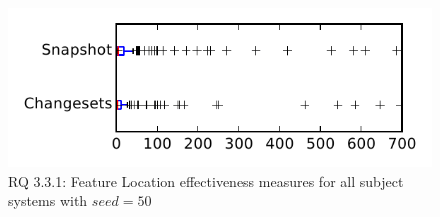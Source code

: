 
\begin{figure}
\centering
\includegraphics[height=0.4\textheight]{figures/flt_seed/rq1_tiny_50}
\caption{RQ 3.3.1: Feature Location effectiveness measures for all subject systems with $seed=50$}
\label{fig:flt_seed:rq1:tiny}
\end{figure}
